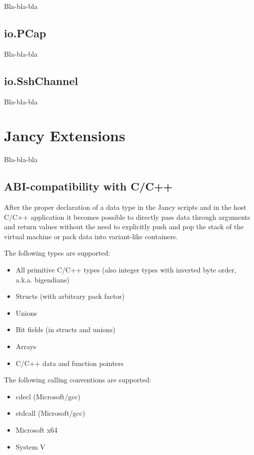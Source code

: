 \documentclass[oneside]{book}
\begin{document}
Bla-bla-bla

\section{io.PCap}

Bla-bla-bla

\section{io.SshChannel}

Bla-bla-bla

\chapter{Jancy Extensions}

Bla-bla-bla

\section{ABI-compatibility with C/C++}

After the proper declaration of a data type in the Jancy scripts and in the host C/C++ application it becomes possible to directly pass data through arguments and return values without the need to explicitly push and pop the stack of the virtual machine or pack data into variant-like containers.

The following types are supported:

\begin{itemize}
\item All primitive C/C++ types (also integer types with inverted byte order, a.k.a. bigendians)
\item Structs (with arbitrary pack factor)
\item Unions
\item Bit fields (in structs and unions)
\item Arrays
\item C/C++ data and function pointers
\end{itemize}

The following calling conventions are supported:

\begin{itemize}
\item cdecl (Microsoft/gcc)
\item stdcall (Microsoft/gcc)
\item Microsoft x64
\item System V
\end{itemize}
\end{document}
